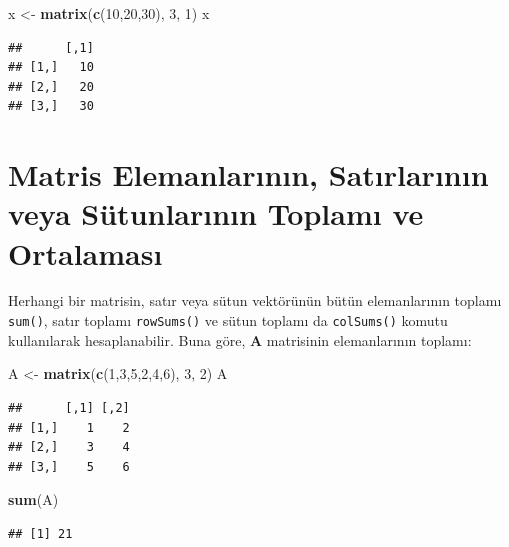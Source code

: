 \documentclass[
]{book}
\newenvironment{Shaded}{\begin{snugshade}}{\end{snugshade}}
\newcommand{\DecValTok}[1]{\textcolor[rgb]{0.00,0.00,0.81}{#1}}
\newcommand{\FunctionTok}[1]{\textcolor[rgb]{0.13,0.29,0.53}{\textbf{#1}}}
\newcommand{\NormalTok}[1]{#1}
\newcommand{\OtherTok}[1]{\textcolor[rgb]{0.56,0.35,0.01}{#1}}
\begin{document}
\begin{Shaded}
\begin{Highlighting}[]
\NormalTok{ x }\OtherTok{\textless{}{-}} \FunctionTok{matrix}\NormalTok{(}\FunctionTok{c}\NormalTok{(}\DecValTok{10}\NormalTok{,}\DecValTok{20}\NormalTok{,}\DecValTok{30}\NormalTok{), }\DecValTok{3}\NormalTok{, }\DecValTok{1}\NormalTok{) }
\NormalTok{ x }
\end{Highlighting}
\end{Shaded}

\begin{verbatim}
##      [,1]
## [1,]   10
## [2,]   20
## [3,]   30
\end{verbatim}

\section{Matris Elemanlarının, Satırlarının veya Sütunlarının Toplamı ve Ortalaması}\label{matris-elemanlarux131nux131n-satux131rlarux131nux131n-veya-suxfctunlarux131nux131n-toplamux131-ve-ortalamasux131}

Herhangi bir matrisin, satır veya sütun vektörünün bütün elemanlarının toplamı \texttt{sum()}, satır toplamı \texttt{rowSums()} ve sütun toplamı da \texttt{colSums()} komutu kullanılarak hesaplanabilir. Buna göre, \textbf{A} matrisinin elemanlarının toplamı:

\begin{Shaded}
\begin{Highlighting}[]
\NormalTok{ A }\OtherTok{\textless{}{-}} \FunctionTok{matrix}\NormalTok{(}\FunctionTok{c}\NormalTok{(}\DecValTok{1}\NormalTok{,}\DecValTok{3}\NormalTok{,}\DecValTok{5}\NormalTok{,}\DecValTok{2}\NormalTok{,}\DecValTok{4}\NormalTok{,}\DecValTok{6}\NormalTok{), }\DecValTok{3}\NormalTok{, }\DecValTok{2}\NormalTok{) }
\NormalTok{ A }
\end{Highlighting}
\end{Shaded}

\begin{verbatim}
##      [,1] [,2]
## [1,]    1    2
## [2,]    3    4
## [3,]    5    6
\end{verbatim}

\begin{Shaded}
\begin{Highlighting}[]
 \FunctionTok{sum}\NormalTok{(A)}
\end{Highlighting}
\end{Shaded}

\begin{verbatim}
## [1] 21
\end{verbatim}
\end{document}
